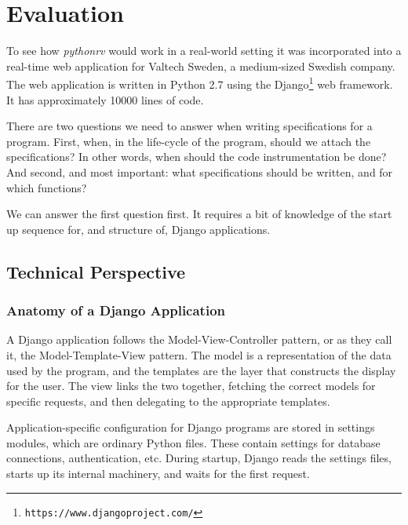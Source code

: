 
\pagestyle{newchap}
\chapter{Evaluation} \label{chapter-evaluation}

To see how \textit{pythonrv} would work in a real-world setting it was
incorporated into a real-time web application for Valtech Sweden, a
medium-sized Swedish company. The web application is written in Python 2.7
using the Django\footnote{\texttt{https://www.djangoproject.com/}} web
framework. It has approximately 10000 lines of code.

There are two questions we need to answer when writing specifications for a
program. First, when, in the life-cycle of the program, should we attach the
specifications? In other words, when should the code instrumentation be done?
And second, and most important: what specifications should be written, and for
which functions?

We can answer the first question first. It requires a bit of knowledge of the
start up sequence for, and structure of, Django applications.


\section{Technical Perspective}

\subsection{Anatomy of a Django Application}

A Django application follows the Model-View-Controller pattern, or as they call
it, the Model-Template-View pattern. The model is a representation of the data
used by the program, and the templates are the layer that constructs the
display for the user. The view links the two together, fetching the correct
models for specific requests, and then delegating to the appropriate templates.

Application-specific configuration for Django programs are stored in settings
modules, which are ordinary Python files. These contain settings for database
connections, authentication, etc. During startup, Django reads the settings
files, starts up its internal machinery, and waits for the first request.


